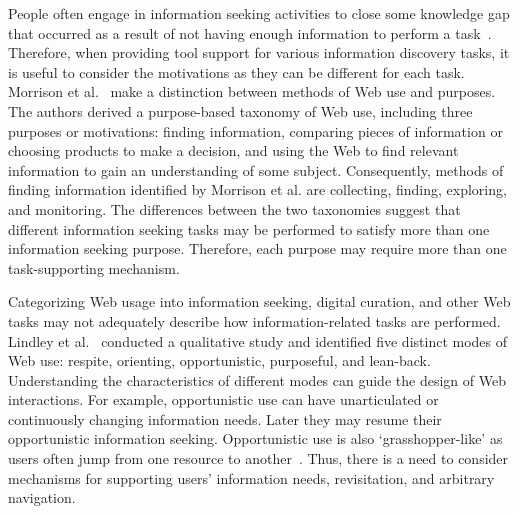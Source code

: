 \documentclass{sigchi}
\begin{document}
People often engage in information seeking activities to close some knowledge gap that occurred as a result of not having enough information to perform a task~\cite{proper1999information}. Therefore, when providing tool support for various information discovery tasks, it is useful to consider the motivations as they can be different for each task. Morrison et al.~\cite{morrison2001taxonomic} make a distinction between methods of Web use and purposes. The authors derived a purpose-based taxonomy of Web use, including three purposes or motivations: finding information, comparing pieces of information or choosing products to make a decision, and using the Web to find relevant information to gain an understanding of some subject. Consequently, methods of finding information identified by Morrison et al. are collecting, finding, exploring, and monitoring. The differences between the two taxonomies suggest that different information seeking tasks may be performed to satisfy more than one information seeking purpose. Therefore, each purpose may require more than one task-supporting mechanism. 

Categorizing Web usage into information seeking, digital curation, and other Web tasks may not adequately describe how information-related tasks are performed. Lindley et al.~\cite{lindley2012s} conducted a qualitative study and
identified five distinct modes of Web use: respite, orienting, opportunistic, purposeful, and lean-back. 
Understanding the characteristics of different modes can guide the design of Web interactions. For example, opportunistic use can have unarticulated or continuously changing information needs. 
Later they may resume their opportunistic information seeking.  Opportunistic use is also `grasshopper-like' as users often jump from one resource to another~\cite{lindley2012s}.
Thus, there is a need to consider mechanisms for supporting users' information needs, revisitation, and arbitrary navigation.
\end{document}
